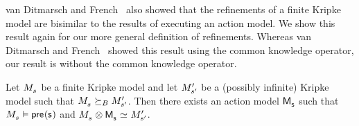 van Ditmarsch and French~\cite{vanditmarsch:2009} also showed that the refinements of a finite Kripke model are bisimilar to the results of executing an action model.
We show this result again for our more general definition of refinements.
Whereas van Ditmarsch and French~\cite{vanditmarsch:2009} showed this result using the common knowledge operator, our result is without the common knowledge operator.

\begin{proposition}
Let $\kPModel{\kStateS}$ be a finite Kripke model and let ${M^{\prime}_{{s}^{\prime}}}$ be a (possibly infinite) Kripke model such that $\kPModel{\kStateS} \simulatesBs \kPModelP{\kStateSP}$.
Then there exists an action model $\aPModel{\aStateS}$ such that $\kPModel{\kStateS} \entails \aPrecondition(\aStateS)$ and $\kPModel{\kStateS} \exec \aPModel{\aStateS} \bisimilar \kPModelP{\kStateSP}$.
\end{proposition}

